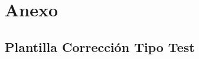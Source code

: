 \documentclass[a4paper,11pt]{book}
\begin{document}
\chapter{ Anexo}

\section{Plantilla Corrección Tipo Test }




%
%
%
%

%
%

\thispagestyle{empty}
\end{document}
